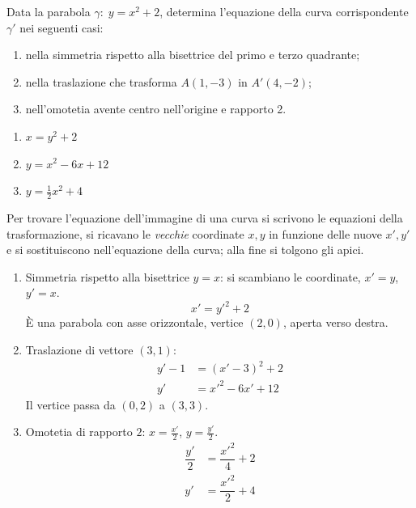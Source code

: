 
\begin{question}[ID=4.2, subtitle={Trasformazioni della parabola $y=x^2+2$}, tags={trasformazioni geometriche, parabola}, difficulty=media]
Data la parabola $\gamma:\; y = x^2 + 2$, determina l'equazione della curva corrispondente $\gamma'$ nei seguenti casi:
\begin{enumerate}
\item nella simmetria rispetto alla bisettrice del primo e terzo quadrante;
\item nella traslazione che trasforma $A(1,-3)$ in $A'(4,-2)$;
\item nell'omotetia avente centro nell'origine e rapporto 2.
\end{enumerate}
\begin{solution}
\begin{enumerate}
    \item $x=y^2+2$
    \item $y=x^2-6x+12$
    \item $y=\tfrac12x^2+4$
\end{enumerate}
\end{solution}
\begin{explanation}
Per trovare l'equazione dell'immagine di una curva si scrivono le equazioni della trasformazione, si ricavano le \emph{vecchie} coordinate $x,y$ in funzione delle nuove $x',y'$ e si sostituiscono nell'equazione della curva; alla fine si tolgono gli apici.
\begin{enumerate}
    \item Simmetria rispetto alla bisettrice $y=x$: si scambiano le coordinate, $x'=y$, $y'=x$.
    \[ x'=y'^2+2 \]
    È una parabola con asse orizzontale, vertice $(2,0)$, aperta verso destra.
    \item Traslazione di vettore $(3,1)$:
    \[\begin{aligned}
    y'-1 &= (x'-3)^2+2\\
    y' &= x'^2-6x'+12
    \end{aligned}\]
    Il vertice passa da $(0,2)$ a $(3,3)$.
    \item Omotetia di rapporto $2$: $x=\tfrac{x'}{2}$, $y=\tfrac{y'}{2}$.
    \[\begin{aligned}
    \dfrac{y'}{2} &= \dfrac{x'^2}{4}+2\\
    y' &= \dfrac{x'^2}{2}+4
    \end{aligned}\]
\end{enumerate}
\end{explanation}
\end{question}

